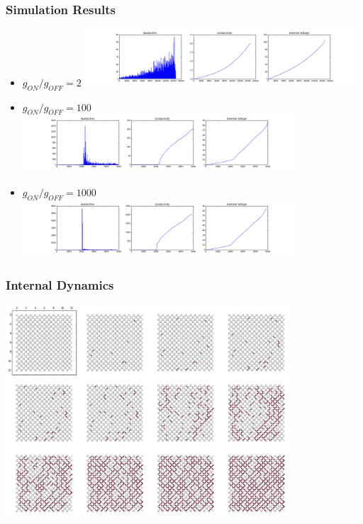 \documentclass[mathserif]{beamer}
\begin{document}
\begin{frame}
\frametitle{Simulation Results}
\begin{itemize}
\item $g_{ON} / g_{OFF} = 2$
\includegraphics[width=0.8\textwidth]{ON2_run.png}
\item $g_{ON} / g_{OFF} = 100$
\includegraphics[width=0.8\textwidth]{ON100_run.png}
\item $g_{ON} / g_{OFF} = 1000$
\includegraphics[width=0.8\textwidth]{ON1000_run.png}
\end{itemize}
\end{frame}

\begin{frame}
\frametitle{Internal Dynamics}
\begin{center}
\includegraphics[width=0.8\textwidth]{Inside_a_network.png}
\end{center}
\end{frame}
\end{document}
